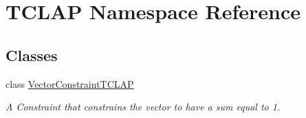 \hypertarget{namespace_t_c_l_a_p}{}\section{T\+C\+L\+AP Namespace Reference}
\label{namespace_t_c_l_a_p}
\subsection*{Classes}
\begin{DoxyCompactItemize}
\item 
class \hyperlink{class_t_c_l_a_p_1_1_vector_constraint_t_c_l_a_p}{Vector\+Constraint\+T\+C\+L\+AP}
\begin{DoxyCompactList}\small\item\em A Constraint that constrains the vector to have a sum equal to 1. \end{DoxyCompactList}\end{DoxyCompactItemize}
